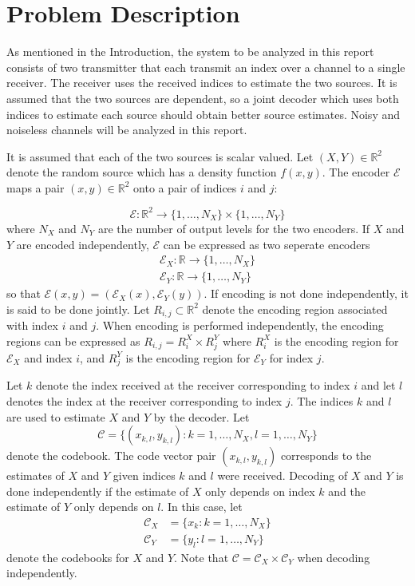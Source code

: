 \documentclass[10pt]{article}
\newcommand{\real}{\mathbb{R}}
\begin{document}
\section{Problem Description}
As mentioned in the Introduction, the system to be analyzed in this report consists of two transmitter that each transmit an index over a channel to a single receiver. The receiver uses the received indices to estimate the two sources. It is assumed that the two sources are dependent, so a joint decoder which uses both indices to estimate each source should obtain better source estimates. Noisy and noiseless channels will be analyzed in this report.

It is assumed that each of the two sources is scalar valued. Let $(X,Y)\in\real^2$ denote the random source which has a density function $f(x,y)$. The encoder $\mathcal{E}$ maps a pair $(x,y) \in \mathbb{R}^2$ onto a pair of indices $i$ and $j$:

\begin{equation*}
    \mathcal{E} : \real^2\to\{1,\ldots,N_X\} \times \{1,\ldots,N_Y\}
\end{equation*}
where $N_X$ and $N_Y$ are the number of output levels for the two encoders. If $X$ and $Y$ are encoded independently, $\mathcal{E}$ can be expressed as two seperate encoders
\begin{gather*}
    \mathcal{E}_X : \real\to\{1,\ldots,N_X\} \\
    \mathcal{E}_Y : \real\to\{1,\ldots,N_Y\}
\end{gather*}
so that $\mathcal{E}(x,y) = (\mathcal{E}_X(x), \mathcal{E}_Y(y))$. If encoding is not done independently, it is said to be done jointly. Let $R_{i,j} \subset \mathbb{R}^2$ denote the encoding region associated with index $i$ and $j$. When encoding is performed independently, the encoding regions can be expressed as $R_{i,j} = R_i^X \times R_j^Y$ where $R_i^X$ is the encoding region for $\mathcal{E}_X$ and index $i$, and $R_j^Y$ is the encoding region for $\mathcal{E}_Y$ for index $j$.

Let $k$ denote the index received at the receiver corresponding to index $i$ and let $l$ denotes the index at the receiver corresponding to index $j$. The indices $k$ and $l$ are used to estimate $X$ and $Y$ by the decoder. Let 
\begin{equation}
\mathcal{C} = \{ (x_{k,l},y_{k,l}) : k = 1,\ldots,N_X, l = 1,\ldots,N_Y\}
\end{equation}
denote the codebook. The code vector pair $(x_{k,l},y_{k,l})$ corresponds to the estimates of $X$ and $Y$ given indices $k$ and $l$ were received. Decoding of $X$ and $Y$ is done independently if the estimate of $X$ only depends on index $k$ and the estimate of $Y$ only depends on $l$. In this case, let
\begin{align}
\mathcal{C}_X &= \{x_k : k = 1,\ldots,N_X\} \\
\mathcal{C}_Y &= \{y_l : l = 1,\ldots,N_Y\}
\end{align}
denote the codebooks for $X$ and $Y$. Note that $\mathcal{C} = \mathcal{C}_X \times \mathcal{C}_Y$ when decoding independently.
\end{document}
